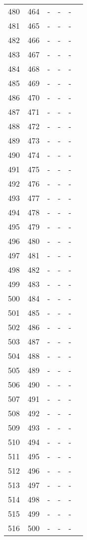 \begin{longtable}{rrrrrr}
  480 & 464 & - & - & - &  \\ 
  481 & 465 & - & - & - &  \\ 
  482 & 466 & - & - & - &  \\ 
  483 & 467 & - & - & - &  \\ 
  484 & 468 & - & - & - &  \\ 
  485 & 469 & - & - & - &  \\ 
  486 & 470 & - & - & - &  \\ 
  487 & 471 & - & - & - &  \\ 
  488 & 472 & - & - & - &  \\ 
  489 & 473 & - & - & - &  \\ 
  490 & 474 & - & - & - &  \\ 
  491 & 475 & - & - & - &  \\ 
  492 & 476 & - & - & - &  \\ 
  493 & 477 & - & - & - &  \\ 
  494 & 478 & - & - & - &  \\ 
  495 & 479 & - & - & - &  \\ 
  496 & 480 & - & - & - &  \\ 
  497 & 481 & - & - & - &  \\ 
  498 & 482 & - & - & - &  \\ 
  499 & 483 & - & - & - &  \\ 
  500 & 484 & - & - & - &  \\ 
  501 & 485 & - & - & - &  \\ 
  502 & 486 & - & - & - &  \\ 
  503 & 487 & - & - & - &  \\ 
  504 & 488 & - & - & - &  \\ 
  505 & 489 & - & - & - &  \\ 
  506 & 490 & - & - & - &  \\ 
  507 & 491 & - & - & - &  \\ 
  508 & 492 & - & - & - &  \\ 
  509 & 493 & - & - & - &  \\ 
  510 & 494 & - & - & - &  \\ 
  511 & 495 & - & - & - &  \\ 
  512 & 496 & - & - & - &  \\ 
  513 & 497 & - & - & - &  \\ 
  514 & 498 & - & - & - &  \\ 
  515 & 499 & - & - & - &  \\ 
  516 & 500 & - & - & - &  \\ 

\end{longtable}
